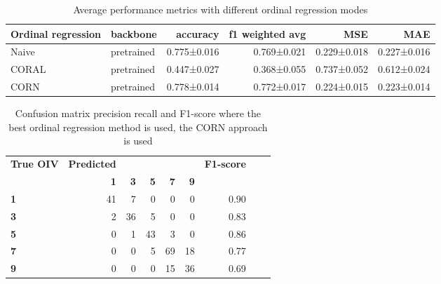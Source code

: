 \documentclass[english]{article}
\begin{document}
\begin{table}[H]
    \centering
    \caption{Average performance metrics with different ordinal regression modes}
    \label{tab:dtafracevol}
    \begin{tabular}{llrrrr}
        \toprule
        Ordinal regression & backbone   & accuracy & f1 weighted avg & MSE & MAE                                 \\
        \midrule
        Naive              & pretrained & 0.775±0.016                               & 0.769±0.021                   & 0.229±0.018 & 0.227±0.016 \\
        CORAL              & pretrained & 0.447±0.027                               & 0.368±0.055                   & 0.737±0.052 & 0.612±0.024 \\
        CORN               & pretrained & 0.778±0.014                               & 0.772±0.017                   & 0.224±0.015 & 0.223±0.014 \\
        \bottomrule
    \end{tabular}
\end{table}


\begin{table}[H]
\centering
\caption{Confusion matrix precision recall and F1-score where the best ordinal regression method is used, the CORN approach is used}
\label{tab:dtafracevol}
\begin{tabular}{lrrrrrrrr}
\toprule
\textbf{True OIV} & \textbf{Predicted} &&&&  & \textbf{F1-score}\\
{} &   \textbf{1} &   \textbf{3} &   \textbf{5} &   \textbf{7} &   \textbf{9}&&\\
\midrule
\textbf{1} &  41 &   7 &   0 &   0 &   0    & 0.90           \\
\textbf{3} &   2 &  36 &   5 &   0 &   0    & 0.83     \\
\textbf{5} &   0 &   1 &  43 &   3 &   0    & 0.86      \\
\textbf{7} &   0 &   0 &   5 &  69 &  18    & 0.77     \\
\textbf{9} &   0 &   0 &   0 &  15 &  36    & 0.69     \\
\bottomrule
\end{tabular}
\end{table}
\end{document}
